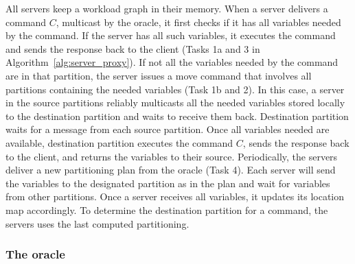 All servers keep a workload graph in their memory. When a server delivers a command $C$, multicast by the oracle, it first checks if it has all variables needed by the command. If the server has all such variables, it executes the command and sends the response back to the client (Tasks 1a and 3 in Algorithm~\ref{alg:server_proxy}).
If not all the variables needed by the command are in that partition, the server issues a move command that involves all partitions containing the needed variables (Task 1b and 2).
In this case, a server in the source partitions reliably multicasts all the needed variables stored locally to the destination partition and waits to receive them back.
Destination partition waits for a message from each source partition. Once all variables needed are available, destination partition executes the command $C$, sends the response back to the client, and returns the variables to their source.
Periodically, the servers deliver a new partitioning plan from the oracle (Task 4). Each server will send the variables to the designated partition as in the plan and wait for variables from other partitions. Once a server receives all variables, it updates its location map accordingly.
To determine the destination partition for a command, the servers uses the last computed partitioning.

\subsubsection{The oracle} 

